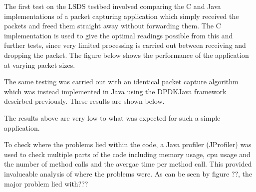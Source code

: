 \documentclass[final_report.tex]{subfiles}
\begin{document}
The first test on the LSDS testbed involved comparing the C and Java implementations of a packet capturing application which simply received the packets and freed them straight away without forwarding them. The C implementation is used to give the optimal readings possible from this and further tests, since very limited processing is carried out between receiving and dropping the packet. The figure below shows the performance of the application at varying packet sizes.



The same testing was carried out with an identical packet capture algorithm which was instead implemented in Java using the DPDKJava framework descirbed previously. These results are shown below.


The results above are very low to what was expected for such a simple application. 

To check where the problems lied within the code, a Java profiler (JProfiler) was used to check multiple parts of the code including memory usage, cpu usage and the number of method calls and the avergae time per method call. This provided invalueable analysis of where the problems were. As can be seen by figure ??, the major problem lied with???

\end{document}
